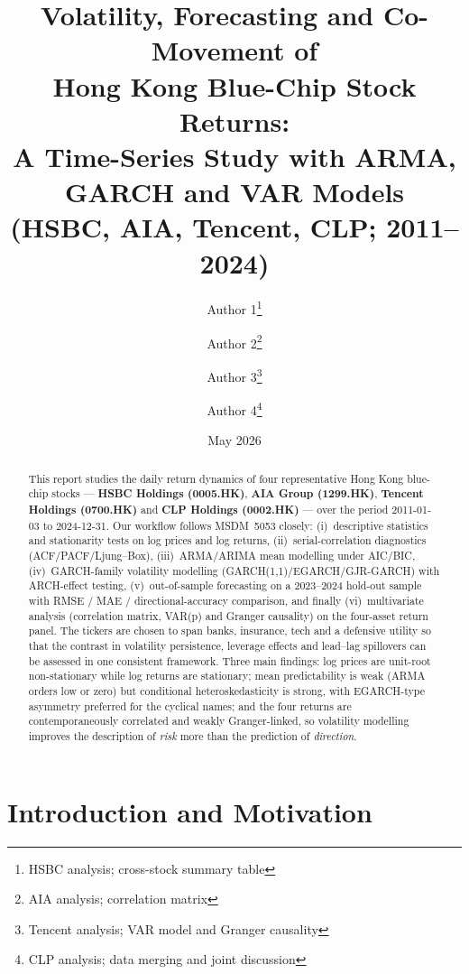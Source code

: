 \documentclass[11pt,a4paper]{article}
\title{\textbf{Volatility, Forecasting and Co-Movement of\\
Hong Kong Blue-Chip Stock Returns:\\
A Time-Series Study with ARMA, GARCH and VAR Models\\
(HSBC, AIA, Tencent, CLP; 2011--2024)}}
\author[1]{Author 1\thanks{HSBC analysis; cross-stock summary table}}
\author[1]{Author 2\thanks{AIA analysis; correlation matrix}}
\author[1]{Author 3\thanks{Tencent analysis; VAR model and Granger causality}}
\author[1]{Author 4\thanks{CLP analysis; data merging and joint discussion}}
\affil[1]{MSDM 5053 Financial Time Series, HKUST}
\date{May 2026}
\begin{document}
\maketitle

\begin{abstract}
\noindent
This report studies the daily return dynamics of four representative
Hong Kong blue-chip stocks --- \textbf{HSBC Holdings (0005.HK)},
\textbf{AIA Group (1299.HK)}, \textbf{Tencent Holdings (0700.HK)} and
\textbf{CLP Holdings (0002.HK)} --- over the period 2011-01-03 to
2024-12-31.  Our workflow follows MSDM~5053 closely:
(i)~descriptive statistics and stationarity tests on log prices and
log returns, (ii)~serial-correlation diagnostics
(ACF/PACF/Ljung--Box), (iii)~ARMA/ARIMA mean modelling under
AIC/BIC, (iv)~GARCH-family volatility modelling
(GARCH(1,1)/EGARCH/GJR-GARCH) with ARCH-effect testing,
(v)~out-of-sample forecasting on a 2023--2024 hold-out sample with
RMSE / MAE / directional-accuracy comparison, and finally
(vi)~multivariate analysis (correlation matrix, VAR(p) and Granger
causality) on the four-asset return panel.  The tickers are chosen
to span banks, insurance, tech and a defensive utility so that the
contrast in volatility persistence, leverage effects and lead--lag
spillovers can be assessed in one consistent framework.  Three main
findings: log prices are unit-root non-stationary while log returns
are stationary; mean predictability is weak (ARMA orders low or
zero) but conditional heteroskedasticity is strong, with EGARCH-type
asymmetry preferred for the cyclical names; and the four returns are
contemporaneously correlated and weakly Granger-linked, so volatility
modelling improves the description of \emph{risk} more than the
prediction of \emph{direction}.
\end{abstract}

\tableofcontents
\newpage

\section{Introduction and Motivation}
\label{sec:intro}
\end{document}
